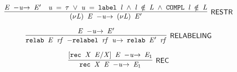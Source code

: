 \begin{equation}
\infer[\HOLRuleName{RESTR}]{\HOLinline{\ensuremath{(\nu}\HOLFreeVar{L}\ensuremath{)} \HOLFreeVar{E} \HOLTokenTransBegin\HOLFreeVar{u}\HOLTokenTransEnd \ensuremath{(\nu}\HOLFreeVar{L}\ensuremath{)} \HOLFreeVar{E\sp{\prime}}}}{\HOLinline{\HOLFreeVar{E} \HOLTokenTransBegin\HOLFreeVar{u}\HOLTokenTransEnd \HOLFreeVar{E\sp{\prime}}}&\HOLinline{\HOLFreeVar{u} \HOLSymConst{\ensuremath{=}} \HOLSymConst{\ensuremath{\tau}} \HOLSymConst{\HOLTokenDisj{}} \HOLFreeVar{u} \HOLSymConst{\ensuremath{=}} \HOLConst{label} \HOLFreeVar{l} \HOLSymConst{\HOLTokenConj{}} \HOLFreeVar{l} \HOLSymConst{\HOLTokenNotIn{}} \HOLFreeVar{L} \HOLSymConst{\HOLTokenConj{}} \HOLConst{COMPL} \HOLFreeVar{l} \HOLSymConst{\HOLTokenNotIn{}} \HOLFreeVar{L}}}
\end{equation}

\begin{equation}
\infer[\HOLRuleName{RELABELING}]{\HOLinline{\HOLConst{relab} \HOLFreeVar{E} \HOLFreeVar{rf} \HOLTokenTransBegin\HOLConst{relabel} \HOLFreeVar{rf} \HOLFreeVar{u}\HOLTokenTransEnd \HOLConst{relab} \HOLFreeVar{E\sp{\prime}} \HOLFreeVar{rf}}}{\HOLinline{\HOLFreeVar{E} \HOLTokenTransBegin\HOLFreeVar{u}\HOLTokenTransEnd \HOLFreeVar{E\sp{\prime}}}}
\end{equation}

\begin{equation}
\infer[\HOLRuleName{REC}]{\HOLinline{\HOLConst{rec} \HOLFreeVar{X} \HOLFreeVar{E} \HOLTokenTransBegin\HOLFreeVar{u}\HOLTokenTransEnd \HOLFreeVar{E\sb{\mathrm{1}}}}}{\HOLinline{\ensuremath{[}\HOLConst{rec} \HOLFreeVar{X} \HOLFreeVar{E}\ensuremath{/}\HOLFreeVar{X}\ensuremath{]} \HOLFreeVar{E} \HOLTokenTransBegin\HOLFreeVar{u}\HOLTokenTransEnd \HOLFreeVar{E\sb{\mathrm{1}}}}}
\end{equation}

